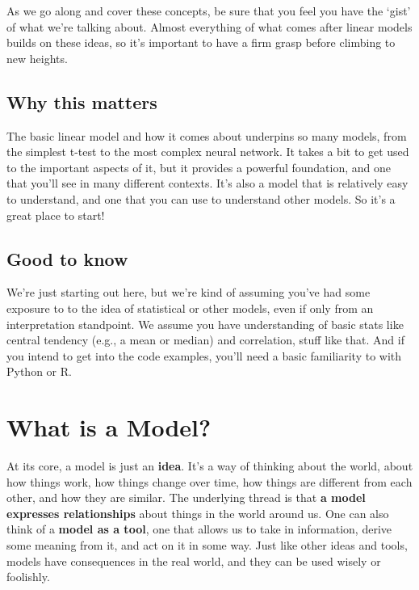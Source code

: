 \documentclass[
  letterpaper,
]{krantz}
\begin{document}
As we go along and cover these concepts, be sure that you feel you have
the `gist' of what we're talking about. Almost everything of what comes
after linear models builds on these ideas, so it's important to have a
firm grasp before climbing to new heights.

\subsection{Why this matters}\label{sec-lm-why-this-matters}

The basic linear model and how it comes about underpins so many models,
from the simplest t-test to the most complex neural network. It takes a
bit to get used to the important aspects of it, but it provides a
powerful foundation, and one that you'll see in many different contexts.
It's also a model that is relatively easy to understand, and one that
you can use to understand other models. So it's a great place to start!

\subsection{Good to know}\label{sec-lm-good-to-know}

We're just starting out here, but we're kind of assuming you've had some
exposure to to the idea of statistical or other models, even if only
from an interpretation standpoint. We assume you have understanding of
basic stats like central tendency (e.g., a mean or median) and
correlation, stuff like that. And if you intend to get into the code
examples, you'll need a basic familiarity to with Python or R.

\section{What is a Model?}\label{sec-lm-what-is-a-model}

At its core, a model is just an \textbf{idea}. It's a way of thinking
about the world, about how things work, how things change over time, how
things are different from each other, and how they are similar. The
underlying thread is that \textbf{a model expresses relationships} about
things in the world around us. One can also think of a \textbf{model as
a tool}, one that allows us to take in information, derive some meaning
from it, and act on it in some way. Just like other ideas and tools,
models have consequences in the real world, and they can be used wisely
or foolishly.
\end{document}

